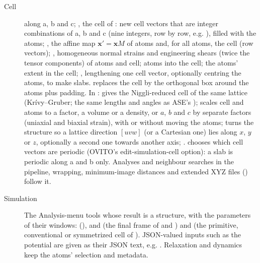 \begin{description}
\item[Cell]  along a, b and c; , the cell of : new cell vectors that are integer combinations of a, b and c (nine integers, row by row, e.g. ), filled with the atoms; , the affine map $\mathbf x' = \mathbf x M$ of atoms and, for all atoms, the cell (row vectors); , homogeneous normal strains and engineering shears (twice the tensor components) of atoms and cell;  atoms into the cell;  the atoms' extent in the cell; , lengthening one cell vector, optionally centring the atoms, to make slabs.  replaces the cell by the orthogonal box around the atoms plus padding. In :  gives the Niggli-reduced cell of the same lattice (Kr\'ivy--Gruber; the same lengths and angles as ASE's );  scales cell and atoms to a factor, a volume or a density, or $a$, $b$ and $c$ by separate factors (uniaxial and biaxial strain), with or without moving the atoms;  turns the structure so a lattice direction $[uvw]$ (or a Cartesian one) lies along $x$, $y$ or $z$, optionally a second one towards another axis; .  chooses which cell vectors are periodic (OVITO's edit-simulation-cell option): a slab is periodic along a and b only. Analyses and neighbour searches in the pipeline, wrapping, minimum-image distances and extended XYZ files () follow it.
\item[Simulation] The Analysis-menu tools whose result is a structure, with the parameters of their windows:  (),  and  (the final frame of  and ) and  (the primitive, conventional or symmetrized cell of ). JSON-valued inputs such as the potential are given as their JSON text, e.g. . Relaxation and dynamics keep the atoms' selection and metadata.

\end{description}
